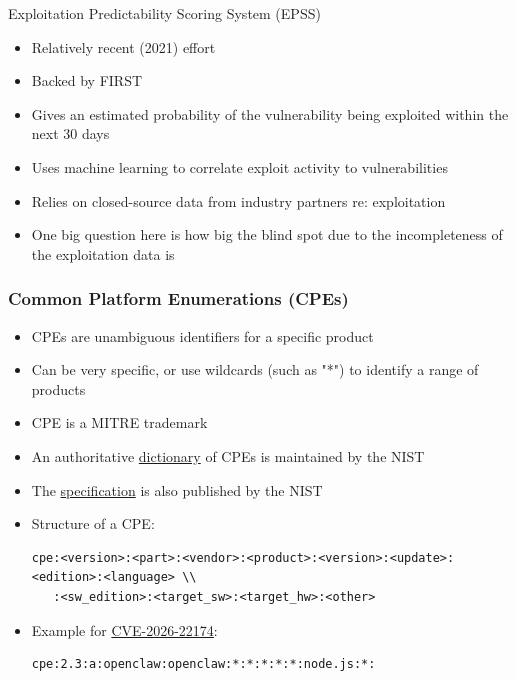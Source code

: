 \begin{frame}{Exploitation Predictability Scoring System (EPSS)}
  \begin{itemize}
    \item Relatively recent (2021) effort
    \item Backed by FIRST
    \item Gives an estimated probability of the vulnerability being exploited within the next 30 days
    \item Uses machine learning to correlate exploit activity to vulnerabilities
    \item Relies on closed-source data from industry partners re: exploitation
    \item One big question here is how big the blind spot due to the
          incompleteness of the exploitation data is
  \end{itemize}
\end{frame}

\begin{frame}[fragile]
  \frametitle{Common Platform Enumerations (CPEs)}
  \begin{itemize}
    \item CPEs are unambiguous identifiers for a specific product
    \item Can be very specific, or use wildcards (such as "*") to identify a range of products
    \item CPE is a MITRE trademark
    \item An authoritative \href{https://nvd.nist.gov/products/cpe}{dictionary} of CPEs is maintained by the NIST
    \item The \href{https://csrc.nist.gov/pubs/ir/7695/final}{specification} is also published by the NIST
    \item Structure of a CPE:
    \begin{verbatim}
cpe:<version>:<part>:<vendor>:<product>:<version>:<update>:<edition>:<language> \\
   :<sw_edition>:<target_sw>:<target_hw>:<other>
    \end{verbatim}
    \item Example for \href{https://github.com/CVEProject/cvelistV5/blob/main/cves/2026/22xxx/CVE-2026-22174.json}{CVE-2026-22174}:
    \begin{verbatim}
cpe:2.3:a:openclaw:openclaw:*:*:*:*:*:node.js:*:
    \end{verbatim}
  \end{itemize}
\end{frame}

